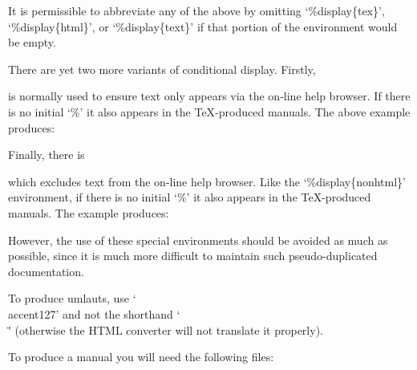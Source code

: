 It  is  permissible  to  abbreviate  any  of  the   above   by   omitting
`\%display\{tex\}', `\%display\{html\}', or `\%display\{text\}'  if  that
portion of the environment would be empty.

There are yet two more variants of conditional display. Firstly,

\begintt
\endtt

is normally used to  ensure  text  only  appears  via  the  on-line  help
browser.  If  there  is  no  initial  `\%'  it  also   appears   in   the
{\TeX}-produced manuals. The above example produces:


Finally, there is

\begintt
\endtt

which  excludes  text  from  the   on-line   help   browser.   Like   the
`\%display\{nonhtml\}' environment, if there is no initial `\%'  it  also
appears in the {\TeX}-produced manuals. The example produces:


However, the use of these special environments should be avoided as  much
as  possible,  since  it  is  much  more  difficult  to   maintain   such
pseudo-duplicated documentation.


To produce umlauts,  use  `\\accent127'  and  not  the  shorthand  `\\\"'
(otherwise the HTML converter will not translate it properly).


To produce a manual you will need the following files:


